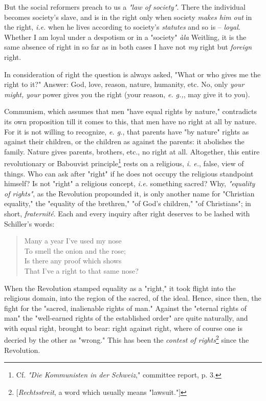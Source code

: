 But the social reformers preach to us a \textit{"{}law of society"{}}. There 
the individual becomes society's slave, and is in the right only when society 
\textit{makes him out} in the right, \textit{i.e.} when he lives according to 
society's \textit{statutes} and so is -- \textit{loyal}. Whether I am loyal 
under a despotism or in a "{}society"{} \textit{\`ala} Weitling, it is the 
same absence of right in so far as in both cases I have not \textit{my} right 
but \textit{foreign} right.

In consideration of right the question is always asked, "{}What or who gives 
me the right to it?"{} Answer: God, love, reason, nature, humanity, etc. No, 
only \textit{your might, your} power gives you the right (your reason, 
\textit{e. g.,}, may give it to you).

Communism, which assumes that men "{}have equal rights by nature,"{} 
contradicts its own proposition till it comes to this, that men have no right 
at all by nature. For it is not willing to recognize, \textit{e. g.}, that 
parents have "{}by nature"{} rights as against their children, or the children 
as against the parents: it abolishes the family. Nature gives parents, 
brothers, etc., no right at all. Altogether, this entire revolutionary or 
Babouvist principle\footnote{Cf. \textit{"{}Die Kommunisten in der 
Schweiz},"{} committee report, p. 3.} rests on a religious, \textit{i. e.}, 
false, view of things. Who can ask after "{}right"{} if he does not occupy the 
religious standpoint himself? Is not "{}right"{} a religious concept, 
\textit{i.e.} something sacred? Why, \textit{"{}equality of rights"{}}, as the 
Revolution propounded it, is only another name for "{}Christian equality,"{} 
the "{}equality of the brethren,"{} "{}of God's children,"{} "{}of 
Christians"{}; in short, \textit{fraternit\'e}. Each and every inquiry after 
right deserves to be lashed with Schiller's words:

\begin{quotation}

\noindent{} Many a year I've used my nose\\
 To smell the onion and the rose;\\
 Is there any proof which shows\\
 That I've a right to that same nose? \end{quotation}

\noindent{}When the Revolution stamped equality as a "{}right,"{} it took 
flight into the religious domain, into the region of the sacred, of the ideal. 
Hence, since then, the fight for the "{}sacred, inalienable rights of man."{} 
Against the "{}eternal rights of man"{} the "{}well-earned rights of the 
established order"{} are quite naturally, and with equal right, brought to 
bear: right against right, where of course one is decried by the other as 
"{}wrong."{} This has been the \textit{contest of 
rights}\footnote{[\textit{Rechtsstreit}, a word which usually means 
"{}lawsuit."{}]} since the Revolution.

